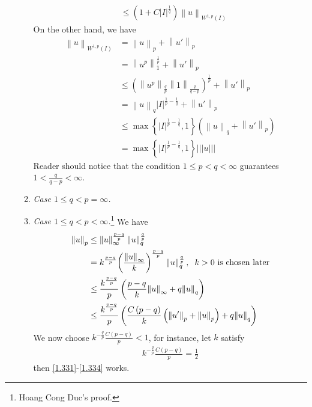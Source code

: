 \documentclass[a4paper,oneside]{book}
\numberwithin{equation}{chapter}
\begin{document}
\begin{enumerate}
\begin{enumerate}
\begin{align}
& \le \left( {1 + C{{\left| I \right|}^{\frac{1}{q}}}} \right){\left\| u \right\|_{{W^{1,p}}\left( I \right)}}
\end{align}
On the other hand, we have
\begin{align}
{\left\| u \right\|_{{W^{1,p}}\left( I \right)}} &= {\left\| u \right\|_p} + {\left\| {u'} \right\|_p}\\
 &= \left\| {{u^p}} \right\|_1^{\frac{1}{p}} + {\left\| {u'} \right\|_p}\\
& \le {\left( {{{\left\| {{u^p}} \right\|}_{\frac{q}{p}}}{{\left\| 1 \right\|}_{\frac{q}{{q - p}}}}} \right)^{\frac{1}{p}}} + {\left\| {u'} \right\|_p}\\
& = {\left\| u \right\|_q}{\left| I \right|^{\frac{1}{p} - \frac{1}{q}}} + {\left\| {u'} \right\|_p}\\
& \le \max \left\{ {{{\left| I \right|}^{\frac{1}{p} - \frac{1}{q}}},1} \right\}\left( {{{\left\| u \right\|}_q} + {{\left\| {u'} \right\|}_p}} \right)\\
& = \max \left\{ {{{\left| I \right|}^{\frac{1}{p} - \frac{1}{q}}},1} \right\}|||u|||
\end{align} 
Reader should notice that the condition $1\le p<q<\infty$ guarantees $1 < \frac{q}{{q - p}} < \infty $.
\item \textit{Case $1 \le q < p = \infty $.} 
\item \textit{Case $1\le q<p<\infty$.}\footnote{Hoang Cong Duc's proof.} We have
\begin{align}
\label{1.331}
{\left\| u \right\|_p} &\le \left\| u \right\|_\infty ^{\frac{{p - q}}{p}}\left\| u \right\|_q^{\frac{q}{p}}\\
& = {k^{\frac{{p - q}}{p}}}{\left( {\frac{{{{\left\| u \right\|}_\infty }}}{k}} \right)^{\frac{{p - q}}{p}}}\left\| u \right\|_q^{\frac{q}{p}},\hspace{0.2cm} k > 0\mbox{ is chosen later}\\
& \le \frac{{{k^{\frac{{p - q}}{p}}}}}{p}\left( {\frac{{p - q}}{k}{{\left\| u \right\|}_\infty } + q{{\left\| u \right\|}_q}} \right)\\
 &\le \frac{{{k^{\frac{{p - q}}{p}}}}}{p}\left( {\frac{{C\left( {p - q} \right)}}{k}\left( {{{\left\| {u'} \right\|}_p} + {{\left\| u \right\|}_p}} \right) + q{{\left\| u \right\|}_q}} \right)\label{1.334}
\end{align}
We now choose ${k^{ - \frac{q}{p}}}\frac{{C\left( {p - q} \right)}}{p} < 1$, for instance, let $k$ satisfy
\begin{align}
{k^{ - \frac{q}{p}}}\frac{{C\left( {p - q} \right)}}{p} = \frac{1}{2}
\end{align}
then \eqref{1.331}-\eqref{1.334} works.
\end{enumerate}
\end{enumerate}
\end{document}
